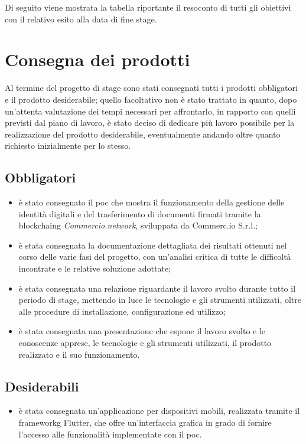 Di seguito viene mostrata la tabella riportante il resoconto di tutti gli obiettivi con il relativo esito alla data di fine stage.

\section{Consegna dei prodotti}

Al termine del progetto di stage sono stati consegnati tutti i prodotti obbligatori e il prodotto desiderabile; quello facoltativo non è stato trattato in quanto, dopo un'attenta valutazione dei tempi necessari per affrontarlo, in rapporto con quelli previsti dal piano di lavoro, è stato deciso di dedicare più lavoro possibile per la realizzazione del prodotto desiderabile, eventualmente andando oltre quanto richiesto inizialmente per lo stesso.

\subsection{Obbligatori}
\begin{itemize}
	\item è stato consegnato il \gls{poc} che mostra il funzionamento della gestione delle identità digitali e del trasferimento di documenti firmati tramite la \gls{blockchaing} \textit{Commercio.network}, sviluppata da Commerc.io S.r.l.;
	\item è stata consegnata la documentazione dettagliata dei risultati ottenuti nel corso delle varie fasi del progetto, con un'analisi critica di tutte le difficoltà incontrate e le relative soluzione adottate;
	\item è stata consegnata una relazione riguardante il lavoro svolto durante tutto il periodo di stage, mettendo in luce le tecnologie e gli strumenti utilizzati, oltre alle procedure di installazione, configurazione ed utilizzo;
	\item è stata consegnata una presentazione che espone il lavoro svolto e le conoscenze apprese, le tecnologie e gli strumenti utilizzati, il prodotto realizzato e il suo funzionamento.
\end{itemize}

\subsection{Desiderabili}

\begin{itemize}
	\item è stata consegnata un'applicazione per dispositivi mobili, realizzata tramite il \gls{frameworkg} Flutter, che offre un'interfaccia grafica in grado di fornire l'accesso alle funzionalità implementate con il \gls{poc}.
\end{itemize}

